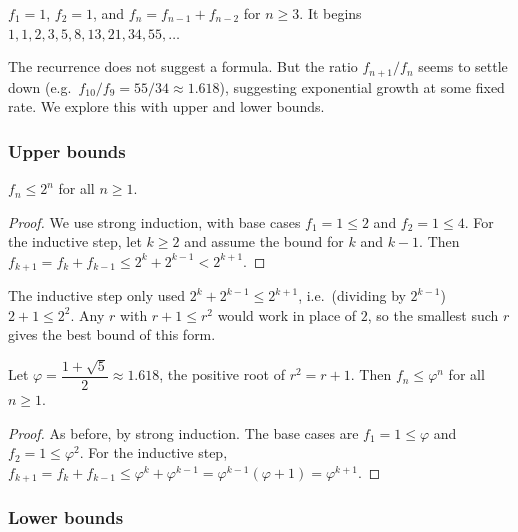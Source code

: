 \begin{definition}
$f_1=1$, $f_2=1$, and $f_n=f_{n-1}+f_{n-2}$ for $n\ge3$. It begins $1,1,2,3,5,8,13,21,34,55,\dots$
\end{definition}

\begin{note}
The recurrence does not suggest a formula. But the ratio $f_{n+1}/f_n$ seems to settle down (e.g.\ $f_{10}/f_9=55/34\approx1.618$), suggesting exponential growth at some fixed rate. We explore this with upper and lower bounds.
\end{note}

\subsubsection{Upper bounds}
\label{sec:6-7-1}

\begin{proposition}
$f_n \le 2^n$ for all $n\ge1$.
\end{proposition}
\begin{proof}
We use strong induction, with base cases $f_1=1\le2$ and $f_2=1\le4$. For the inductive step, let $k\ge2$ and assume the bound for $k$ and $k-1$. Then $f_{k+1}=f_k+f_{k-1}\le2^k+2^{k-1}<2^{k+1}$.
\end{proof}

\begin{note}
The inductive step only used $2^k+2^{k-1}\le2^{k+1}$, i.e.\ (dividing by $2^{k-1}$) $2+1\le2^2$. Any $r$ with $r+1\le r^2$ would work in place of $2$, so the smallest such $r$ gives the best bound of this form.
\end{note}

\begin{proposition}
Let $\varphi = \dfrac{1+\sqrt5}{2}\approx1.618$, the positive root of $r^2=r+1$. Then $f_n \le \varphi^n$ for all $n\ge1$.
\end{proposition}
\begin{proof}
As before, by strong induction. The base cases are $f_1=1\le\varphi$ and $f_2=1\le\varphi^2$. For the inductive step, $f_{k+1}=f_k+f_{k-1}\le\varphi^k+\varphi^{k-1}=\varphi^{k-1}(\varphi+1)=\varphi^{k+1}$.
\end{proof}

\subsubsection{Lower bounds}
\label{sec:6-7-2}

